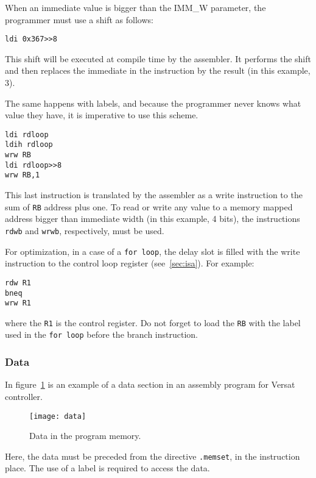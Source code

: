 When an immediate value is bigger than the IMM\_W parameter, the
programmer must use a shift as follows:
\begin{verbatim}
ldi 0x367>>8
\end{verbatim}

This shift will be executed at compile time by the assembler. It
performs the shift and then replaces the immediate in the instruction
by the result (in this example, $3$).

The same happens with labels, and because the programmer never knows
what value they have, it is imperative to use this scheme.

\begin{verbatim}
ldi rdloop
ldih rdloop
wrw RB
ldi rdloop>>8
wrw RB,1
\end{verbatim}

This last instruction is translated by the assembler as a write
instruction to the sum of {\tt RB} address plus one. To read or write
any value to a memory mapped address bigger than immediate width (in
this example, 4 bits), the instructions {\tt rdwb} and {\tt wrwb},
respectively, must be used.

For optimization, in a case of a {\tt for loop}, the delay slot is
filled with the write instruction to the control loop register
(see~\ref{sec:isa}). For example:
\begin{verbatim}
rdw R1
bneq
wrw R1
\end{verbatim}
where the {\tt R1} is the control register. Do not forget to load the
{\tt RB} with the label used in the {\tt for loop} before the branch
instruction.

\newpage

\subsubsection{Data}

In figure~\ref{fig:as_data} is an example of a data section in an
assembly program for Versat controller.

\begin{figure}[!htbp]
    \centerline{\texttt{[image: data]}}
    \vspace{0cm}\caption{Data in the program memory.}
    \label{fig:as_data}
\end{figure}

Here, the data must be preceded from the directive {\tt .memset}, in
the instruction place. The use of a label is required to access the
data.
